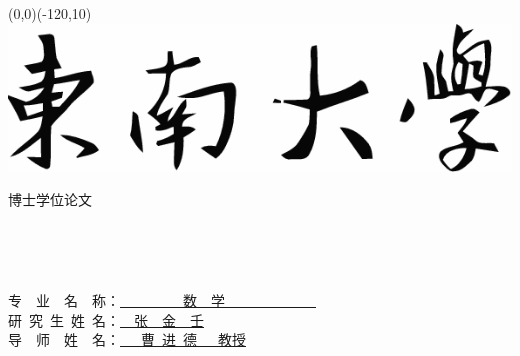 \documentclass[a4paper,UTF8,12pt]{ctexbook}
\begin{document}
	\setlength{\baselineskip}{22pt}
	 \makeatletter
	\newcommand{\universityname}{东南大学}
	\newcommand{\universitynameeng}{Southeast University}
	\newcommand{\schoolcodepre}{学校代码}
	\newcommand{\schoolcode}{10286}
	\newcommand{\secretlevelpre}{密级} 
	\newcommand{\categorynumberpre}{分类号}
	\newcommand{\studentidpre}{学号}
	\newcommand{\authorpre}{研究生姓名：}
	\newcommand{\advisorpre}{导~~师~~姓~~名：}
	\newcommand{\appdegreepre}{申请学位类别}
	\newcommand{\majorpre}{一级学科名称}
	\newcommand{\submajorpre}{二级学科名称}
	\newcommand{\defenddatepre}{论文答辩日期}
	\newcommand{\authorizeorganizationpre}{学位授予单位}
	\newcommand{\@authorizeorganization}{~~东~南~大~学~~}
	\newcommand{\authorizedatepre}{学位授予日期}
	\newcommand{\committeechairpre}{答辩委员会主席}
	\newcommand{\readerpre}{评~~~~~~~~~阅~~~~~~~~~人}
	\newcommand{\@abstracttitle}{摘\quad 要}
	\newcommand{\@abstracttitletoc}{摘要}
	\newcommand{\@terminologytitle}{本论文专用术语的注释表}
	\renewcommand{\bibname}{参考文献}
	
	\thispagestyle{empty}
	\medskip\medskip %
	\vskip 12cm
	
	\begin{picture}(0,0)(-120,10)
	{\includegraphics[width=\textwidth,bb=-40 0 1683 986]{seu/seu-text-logo.png}}
	\end{picture}
	
	
\medskip
\vskip 0.6cm
\begin{center}
    {\heiti{}博士学位论文}
\end{center}　
\medskip
\vskip 2cm
\begin{center}{}
\end{center}　

\medskip
\vskip 3cm

\begin{center}
    {
        专~~业~~名~~称：\underline{\quad ~~~~~~~~~数~~学~~~~~~~~~~~~~\quad}\\
        \medskip
        \vskip 1cm
         研~究~生~姓~名：\underline{\quad\quad~~张~~金~~壬\qquad\quad}\\
        \medskip
        \vskip 1cm
        导~~师~~姓~~名：\underline{\quad~~~曹~进~德~~~教授\qquad}
    }
\end{center}
\medskip
\end{document}
